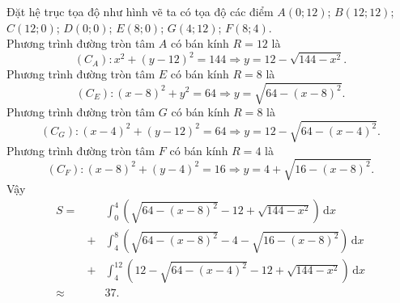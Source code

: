 \begin{bt}
{\begin{center}
	\end{center} Đặt hệ trục tọa độ như hình vẽ ta có tọa độ các điểm $A(0;12)$; $B(12;12)$; $C(12;0)$; $D(0;0)$; $E(8;0)$; $G(4;12)$; $F(8;4)$.\\
	Phương trình đường tròn tâm $A$ có bán kính $R=12$ là $$(C_A)\colon x^2+(y-12)^2=144 \Rightarrow y=12-\sqrt{144-x^2}.$$ 
	Phương trình đường tròn tâm  $E$ có bán kính $R=8$ là $$(C_E)\colon (x-8)^2+y^2=64 \Rightarrow y=\sqrt{64-(x-8)^2}.$$
	Phương trình đường tròn tâm $G$  có bán kính $R=8$ là $$(C_G)\colon (x-4)^2+(y-12)^2=64 \Rightarrow y=12-\sqrt{64-(x-4)^2}.$$ Phương trình đường tròn tâm $F$ có bán kính $R=4$ là $$(C_F)\colon (x-8)^2 + (y-4)^2 = 16 \Rightarrow y = 4 + \sqrt{16-(x-8)^2}.$$
	Vậy \begin{eqnarray*}
	S  =&& \displaystyle\int_{0}^{4} \left( \sqrt{64-(x-8)^2} - 12 + \sqrt{144-x^2} \right) \mathrm{\,d}x\\
	&+& \displaystyle\int_{4}^{8} \left( \sqrt{64-(x-8)^2} - 4 - \sqrt{16-(x-8)^2} \right) \mathrm{\,d}x\\ 
	 &+& \displaystyle\int_{4}^{12} \left( 12-\sqrt{64-(x-4)^2} - 12 + \sqrt{144-x^2} \right) \mathrm{\,d}x\\
	\approx&& 37. 
\end{eqnarray*} }
\end{bt}

